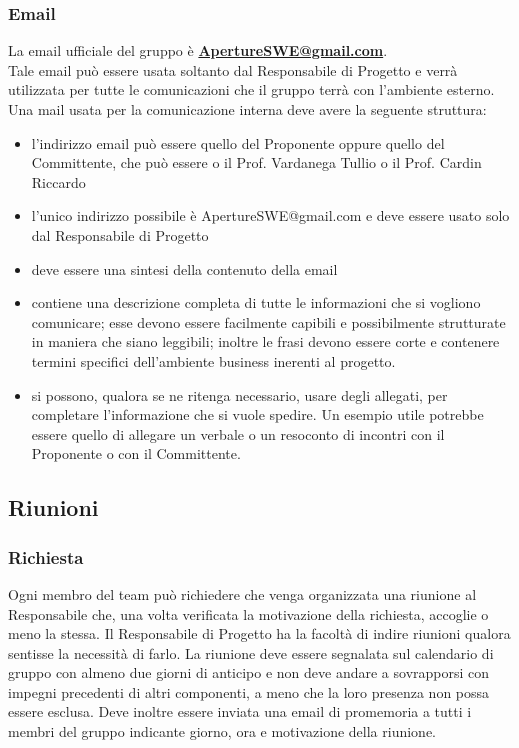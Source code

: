 \subsubsection{Email}
La email ufficiale del gruppo è \textbf{\url{ApertureSWE@gmail.com}}.\\
Tale email può essere usata soltanto dal Responsabile di Progetto e verrà utilizzata per tutte le comunicazioni che il gruppo terrà con l'ambiente esterno.
Una mail usata per la comunicazione interna deve avere la seguente struttura:
\begin{itemize}
\item {}l'indirizzo email può essere quello del Proponente oppure quello del Committente, che può essere o il Prof. Vardanega Tullio o il Prof. Cardin Riccardo
\item {}l'unico indirizzo possibile è ApertureSWE@gmail.com e deve essere usato solo dal Responsabile di Progetto
\item {} deve essere una sintesi della contenuto della email
\item {} contiene una descrizione completa di tutte le informazioni che si vogliono comunicare; esse devono essere facilmente capibili e possibilmente strutturate in maniera che siano leggibili; inoltre le frasi devono essere corte e contenere termini specifici dell'ambiente business inerenti al progetto.
\item {} si possono, qualora se ne ritenga necessario, usare degli allegati, per completare l'informazione che si vuole spedire. Un esempio utile potrebbe essere quello di allegare un verbale o un resoconto di incontri con il Proponente  o con il Committente.
\end{itemize}


\subsection{Riunioni}
\label{3.3}

\subsubsection{Richiesta}
\label{3.3.1}
Ogni membro del team può richiedere che venga organizzata una riunione al Responsabile che, una volta verificata la motivazione della richiesta, accoglie o meno la stessa.
Il Responsabile di Progetto ha la facoltà di indire riunioni qualora sentisse la necessità di farlo.
La riunione deve essere segnalata sul calendario di gruppo con almeno due giorni di anticipo e non deve andare a sovrapporsi con impegni precedenti di altri componenti, a meno che la loro presenza non possa essere esclusa. Deve inoltre essere inviata una email di promemoria a tutti i membri del gruppo indicante giorno, ora e motivazione della riunione.

